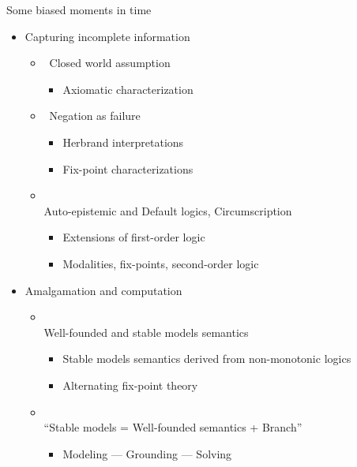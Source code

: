 \begin{frame}{Some biased moments in time}
  \begin{itemize}
  \item<1-> Capturing incomplete information
    \begin{itemize}
    \item<only@2->  \ Closed world assumption
      \begin{itemize}
      \item<only@3-5> Axiomatic characterization
      \end{itemize}
    \item<only@2->  \ Negation as failure
      \begin{itemize}
      \item<only@4-5> Herbrand interpretations
      \item<only@4-5> Fix-point characterizations
      \end{itemize}
    \item<only@2-> \\ Auto-epistemic and Default logics, Circumscription
      \begin{itemize}
      \item<only@5-5> Extensions of first-order logic
      \item<only@5-5> Modalities, fix-points, second-order logic
      \end{itemize}
    \end{itemize}
  \item<only@6-> Amalgamation and computation
    \begin{itemize}
    \item<only@7-> \\ Well-founded and stable models semantics
      \begin{itemize}
      \item<only@8-9> Stable models semantics derived from non-monotonic logics
      \item<only@8-9> Alternating fix-point theory
      \end{itemize}
    \item<only@7-> \\ ``Stable models = Well-founded semantics + Branch''
      \begin{itemize}
      \item <only@9-9>Modeling --- Grounding --- Solving

\end{itemize}
\end{itemize}
\end{itemize}
\end{frame}
